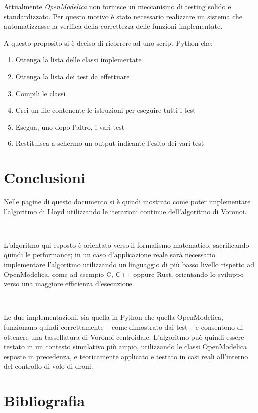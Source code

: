\documentclass[11pt,a4paper]{report}
\begin{document}
Attualmente \textit{OpenModelica} non fornisce un meccanismo di testing solido e standardizzato. Per questo motivo è stato necessario realizzare un sistema che automatizzasse la verifica della correttezza delle funzioni implementate.

A questo proposito si è deciso di ricorrere ad uno script Python che:

\begin{enumerate}
	\item Ottenga la lista delle classi implementate
	\item Ottenga la lista dei test da effettuare
	\item Compili le classi
	\item Crei un file contenente le istruzioni per eseguire tutti i test
	\item Esegua, uno dopo l'altro, i vari test
	\item Restituisca a schermo un output indicante l'esito dei vari test
\end{enumerate}



\chapter{Conclusioni}

Nelle pagine di questo documento si è quindi mostrato come poter implementare l'algoritmo di Lloyd utilizzando le iterazioni continue dell'algoritmo di Voronoi.

\

L'algoritmo qui esposto è orientato verso il formalismo matematico, sacrificando quindi le performance; in un caso d'applicazione reale sarà necessario implementare l'algoritmo utilizzando un linguaggio di più basso livello rispetto ad OpenModelica, come ad esempio C, C++ oppure Rust, orientando lo sviluppo verso una maggiore efficienza d'esecuzione.

\

Le due implementazioni, sia quella in Python che quella OpenModelica, funzionano quindi correttamente -- come dimostrato dai test -- e consentono di ottenere una tassellatura di Voronoi centroidale. L'algoritmo può quindi essere testato in un contesto simulativo più ampio, utilizzando le classi OpenModelica esposte in precedenza, e teoricamente applicato e testato in casi reali all'interno del controllo di volo di droni.

\chapter*{Bibliografia}
\end{document}
